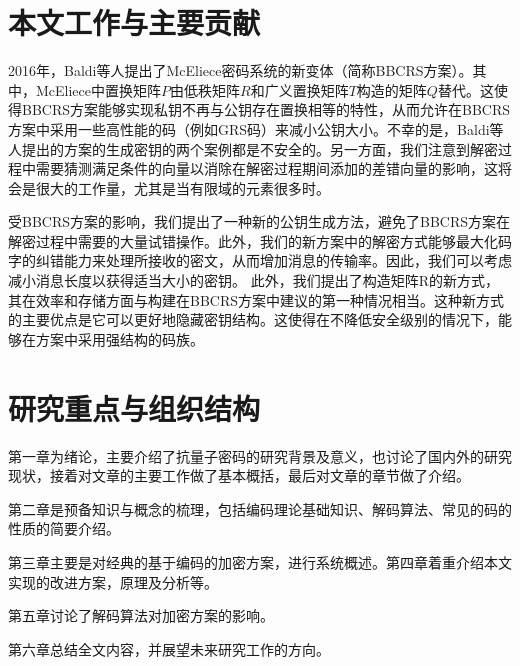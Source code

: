\section{本文工作与主要贡献}
2016年，Baldi等人提出了McEliece密码系统的新变体（简称BBCRS方案）。其中，McEliece中置换矩阵$P$由低秩矩阵$R$和广义置换矩阵$T$构造的矩阵$Q$替代。这使得BBCRS方案能够实现私钥不再与公钥存在置换相等的特性，从而允许在BBCRS方案中采用一些高性能的码（例如GRS码）来减小公钥大小。不幸的是，Baldi等人提出的方案的生成密钥的两个案例都是不安全的。另一方面，我们注意到解密过程中需要猜测满足条件的向量以消除在解密过程期间添加的差错向量的影响，这将会是很大的工作量，尤其是当有限域的元素很多时。

受BBCRS方案的影响，我们提出了一种新的公钥生成方法，避免了BBCRS方案在解密过程中需要的大量试错操作。此外，我们的新方案中的解密方式能够最大化码字的纠错能力来处理所接收的密文，从而增加消息的传输率。因此，我们可以考虑减小消息长度以获得适当大小的密钥。 此外，我们提出了构造矩阵R的新方式，其在效率和存储方面与构建在BBCRS方案中建议的第一种情况相当。这种新方式的主要优点是它可以更好地隐藏密钥结构。这使得在不降低安全级别的情况下，能够在方案中采用强结构的码族。

\section{研究重点与组织结构}
第一章为绪论，主要介绍了抗量子密码的研究背景及意义，也讨论了国内外的研究现状，接着对文章的主要工作做了基本概括，最后对文章的章节做了介绍。

第二章是预备知识与概念的梳理，包括编码理论基础知识、解码算法、常见的码的性质的简要介绍。

第三章主要是对经典的基于编码的加密方案，进行系统概述。第四章着重介绍本文实现的改进方案，原理及分析等。

第五章讨论了解码算法对加密方案的影响。

第六章总结全文内容，并展望未来研究工作的方向。